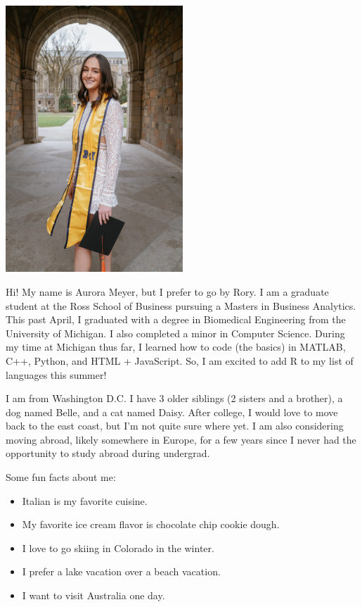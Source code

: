 \documentclass[
]{book}
\providecommand{\tightlist}{%
  \setlength{\itemsep}{0pt}\setlength{\parskip}{0pt}}
\begin{document}
\includegraphics[width=0.5\textwidth,height=\textheight]{gradphoto.jpg}

Hi! My name is Aurora Meyer, but I prefer to go by Rory. I am a graduate student at the Ross School of Business pursuing a Masters in Business Analytics. This past April, I graduated with a degree in Biomedical Engineering from the University of Michigan. I also completed a minor in Computer Science. During my time at Michigan thus far, I learned how to code (the basics) in MATLAB, C++, Python, and HTML + JavaScript. So, I am excited to add R to my list of languages this summer!

I am from Washington D.C. I have 3 older siblings (2 sisters and a brother), a dog named Belle, and a cat named Daisy. After college, I would love to move back to the east coast, but I'm not quite sure where yet. I am also considering moving abroad, likely somewhere in Europe, for a few years since I never had the opportunity to study abroad during undergrad.

Some fun facts about me:

\begin{itemize}
\tightlist
\item
  Italian is my favorite cuisine.
\item
  My favorite ice cream flavor is chocolate chip cookie dough.
\item
  I love to go skiing in Colorado in the winter.
\item
  I prefer a lake vacation over a beach vacation.
\item
  I want to visit Australia one day.
\end{itemize}
\end{document}
